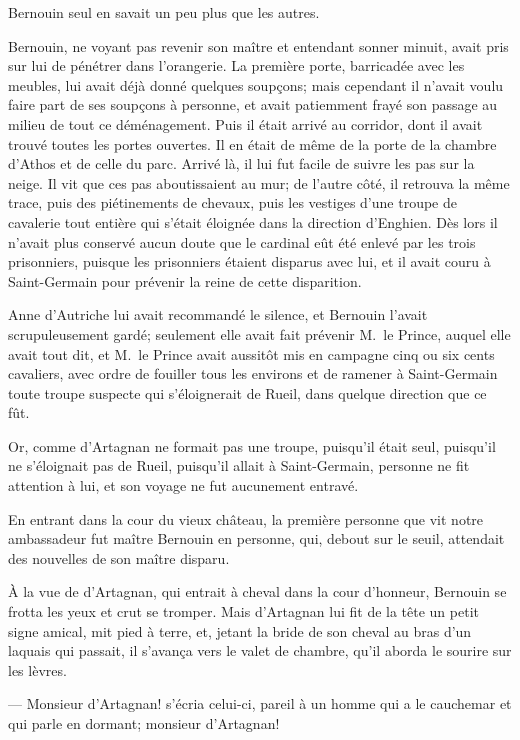 Bernouin seul en savait un peu plus que les autres.

Bernouin, ne voyant pas revenir son maître et entendant sonner minuit, avait pris sur lui de pénétrer dans l'orangerie. La première porte, barricadée avec les meubles, lui avait déjà donné quelques soupçons; mais cependant il n'avait voulu faire part de ses soupçons à personne, et avait patiemment frayé son passage au milieu de tout ce déménagement. Puis il était arrivé au corridor, dont il avait trouvé toutes les portes ouvertes. Il en était de même de la porte de la chambre d'Athos et de celle du parc. Arrivé là, il lui fut facile de suivre les pas sur la neige. Il vit que ces pas aboutissaient au mur; de l'autre côté, il retrouva la même trace, puis des piétinements de chevaux, puis les vestiges d'une troupe de cavalerie tout entière qui s'était éloignée dans la direction d'Enghien. Dès lors il n'avait plus conservé aucun doute que le cardinal eût été enlevé par les trois prisonniers, puisque les prisonniers étaient disparus avec lui, et il avait couru à Saint-Germain pour prévenir la reine de cette disparition.

Anne d'Autriche lui avait recommandé le silence, et Bernouin l'avait scrupuleusement gardé; seulement elle avait fait prévenir M.~le Prince, auquel elle avait tout dit, et M.~le Prince avait aussitôt mis en campagne cinq ou six cents cavaliers, avec ordre de fouiller tous les environs et de ramener à Saint-Germain toute troupe suspecte qui s'éloignerait de Rueil, dans quelque direction que ce fût.

Or, comme d'Artagnan ne formait pas une troupe, puisqu'il était seul, puisqu'il ne s'éloignait pas de Rueil, puisqu'il allait à Saint-Germain, personne ne fit attention à lui, et son voyage ne fut aucunement entravé.

En entrant dans la cour du vieux château, la première personne que vit notre ambassadeur fut maître Bernouin en personne, qui, debout sur le seuil, attendait des nouvelles de son maître disparu.

À la vue de d'Artagnan, qui entrait à cheval dans la cour d'honneur, Bernouin se frotta les yeux et crut se tromper. Mais d'Artagnan lui fit de la tête un petit signe amical, mit pied à terre, et, jetant la bride de son cheval au bras d'un laquais qui passait, il s'avança vers le valet de chambre, qu'il aborda le sourire sur les lèvres.

— Monsieur d'Artagnan! s'écria celui-ci, pareil à un homme qui a le cauchemar et qui parle en dormant; monsieur d'Artagnan!

